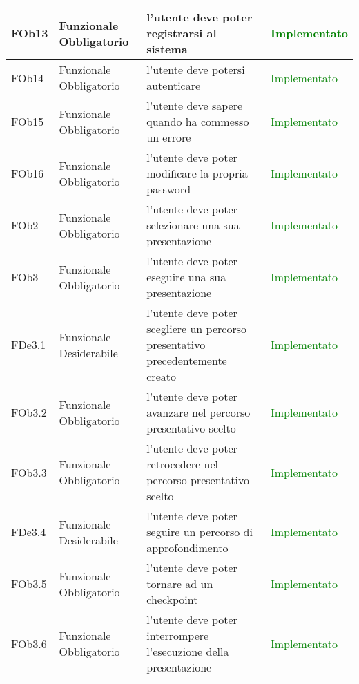 \begin{longtable}{|l|p{2.5cm}|p{5cm}|p{3.5cm}|}
\hline
FOb13 & Funzionale \linebreak Obbligatorio & l'utente deve poter registrarsi al sistema & \textcolor{green}{Implementato} \\
\hline
FOb14 & Funzionale \linebreak Obbligatorio & l'utente deve potersi autenticare & \textcolor{green}{Implementato} \\
\hline
FOb15 & Funzionale \linebreak Obbligatorio & l'utente deve sapere quando ha commesso un errore & \textcolor{green}{Implementato} \\
\hline
FOb16 & Funzionale \linebreak Obbligatorio & l'utente deve poter modificare la propria password & \textcolor{green}{Implementato} \\
\hline
FOb2 & Funzionale \linebreak Obbligatorio & l'utente deve poter selezionare una sua presentazione & \textcolor{green}{Implementato} \\
\hline
FOb3 & Funzionale \linebreak Obbligatorio & l'utente deve poter eseguire una sua presentazione & \textcolor{green}{Implementato} \\
\hline
FDe3.1 & Funzionale \linebreak Desiderabile & l'utente deve poter scegliere un percorso presentativo precedentemente creato & \textcolor{green}{Implementato}  \\
\hline
FOb3.2 & Funzionale \linebreak Obbligatorio & l'utente deve poter avanzare nel percorso presentativo scelto & \textcolor{green}{Implementato}  \\
\hline
FOb3.3 & Funzionale \linebreak Obbligatorio & l'utente deve poter retrocedere nel percorso presentativo scelto & \textcolor{green}{Implementato}  \\
\hline
FDe3.4 & Funzionale \linebreak Desiderabile & l'utente deve poter seguire un percorso di approfondimento & \textcolor{green}{Implementato}  \\
\hline
FOb3.5 & Funzionale \linebreak Obbligatorio & l'utente deve poter tornare ad un checkpoint &\textcolor{green}{Implementato}  \\
\hline
FOb3.6 & Funzionale \linebreak Obbligatorio & l'utente deve poter interrompere l'esecuzione della presentazione & \textcolor{green}{Implementato}  \\

\end{longtable}
